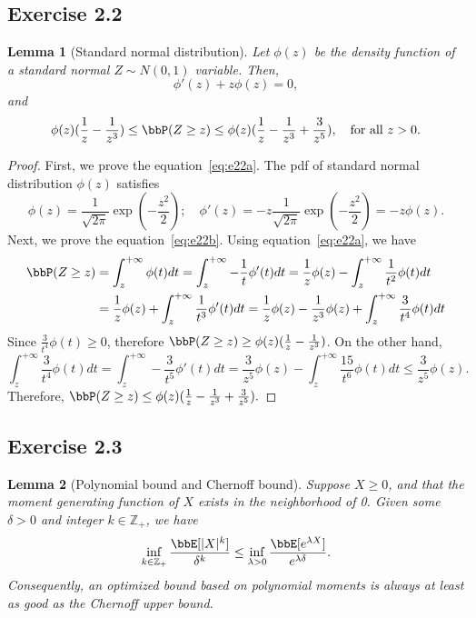 \documentclass[11pt]{article}
\theoremstyle{plain}
\newtheorem{lem}{Lemma}
\theoremstyle{definition}
\begin{document}
\subsection{Exercise 2.2}
\begin{lem}[Standard normal distribution]\label{lem:n01}
	Let $\phi(z)$ be the density function of a standard normal $Z \sim N(0,1)$ variable. Then, 
	\begin{equation}\label{eq:e22a}
		\phi'(z) + z \phi(z) = 0,
	\end{equation}
	and \begin{equation}\label{eq:e22b}
		\phi(z)(\frac{1}{z} - \frac{1}{z^3} ) \leq \bbP(Z \geq z) \leq \phi(z)(\frac{1}{z} - \frac{1}{z^3}+ \frac{3}{z^5} ), \quad \text{for all }z>0.
	\end{equation}
\end{lem}
\begin{proof}First, we prove the equation~\eqref{eq:e22a}. The pdf of standard normal distribution $\phi(z)$ satisfies
\[  \phi(z) = \frac{1}{\sqrt{2\pi}} \exp(-\frac{z^2}{2}  ); \quad \phi'(z) = -z \frac{1}{\sqrt{2\pi}} \exp(-\frac{z^2}{2} ) = -z \phi(z). \]
	Next, we prove the equation~\eqref{eq:e22b}. Using equation~\eqref{eq:e22a}, we have
	\begin{align}
		\bbP(Z \geq z) &= \int_{z}^{+\infty} \phi(t) dt = \int_{z}^{+\infty} - \frac{1}{t} \phi'(t) dt = \frac{1}{z} \phi(z) - \int_{z}^{+\infty} \frac{1}{t^2} \phi(t) dt\\
		&= \frac{1}{z} \phi(z) + \int_{z}^{+\infty} \frac{1}{t^3} \phi'(t) dt =  \frac{1}{z} \phi(z) - \frac{1}{z^3} \phi(z) + \int_{z}^{+\infty} \frac{3}{t^4} \phi(t) dt
	\end{align}
	Since $\frac{3}{t^4} \phi(t) \geq 0$, therefore $\bbP(Z \geq z) \geq \phi(z)(\frac{1}{z}  - \frac{1}{z^3} )$. On the other hand, 
	\[ \int_{z}^{+\infty} \frac{3}{t^4} \phi(t) dt = \int_{z}^{+\infty} - \frac{3}{t^5} \phi'(t) dt =\frac{3}{ z^5} \phi(z) -  \int_{z}^{+\infty} \frac{15}{t^6} \phi(t) dt \leq \frac{3}{ z^5} \phi(z). \]
	Therefore, $\bbP(Z \geq z) \leq \phi(z)(\frac{1}{z}  - \frac{1}{z^3} + \frac{3}{z^5} ).$
\end{proof}

\subsection{Exercise 2.3}

\begin{lem}[Polynomial bound and Chernoff bound]\label{lem:momcher}
	Suppose $X \geq 0$, and that the moment generating function of $X$ exists in the neighborhood of 0. Given some $\delta > 0$ and integer $ k \in \mathbb{Z_+}$, we have
	\[  \inf_{k \in \mathbb{Z_+} } \frac{\bbE[|X|^k]}{\delta^k} \leq \inf_{\lambda >0} \frac{\bbE[e^{\lambda X}]}{e^{\lambda \delta}}. \]
	Consequently, an optimized bound based on polynomial moments is always at least as good as the Chernoff upper bound.
\end{lem}
\end{document}
